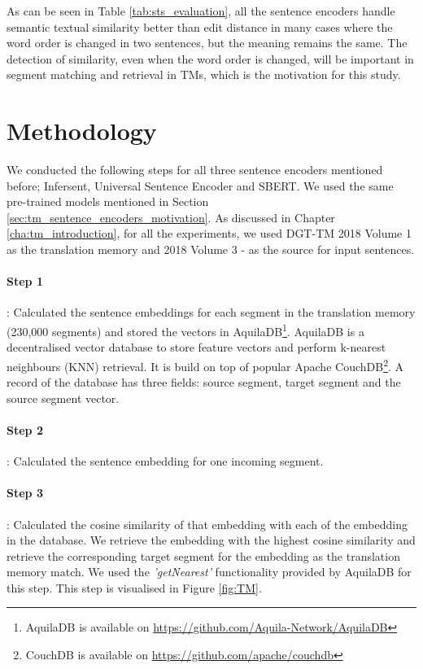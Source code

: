 As can be seen in Table \ref{tab:sts_evaluation}, all the sentence encoders handle semantic textual similarity better than edit distance in many cases where the word order is changed in two sentences, but the meaning remains the same. The detection of similarity, even when the word order is changed, will be important in segment matching and retrieval in TMs, which is the motivation for this study.


\section{Methodology}
\label{sec:tm_sentence_encoders_method}

We conducted the following steps for all three sentence encoders mentioned before; Infersent, Universal Sentence Encoder and SBERT. We used the same pre-trained models mentioned in Section \ref{sec:tm_sentence_encoders_motivation}. As discussed in Chapter \ref{cha:tm_introduction}, for all the experiments, we used DGT-TM 2018 Volume 1 as the translation memory and 2018 Volume 3 - as the source for input sentences. 


	\paragraph{Step 1}: Calculated the sentence embeddings for each segment in the translation memory (230,000 segments) and stored the vectors in AquilaDB\footnote{AquilaDB is available on \url{https://github.com/Aquila-Network/AquilaDB}}. AquilaDB is a decentralised vector database to store feature vectors and perform k-nearest neighbours (KNN) retrieval. It is build on top of popular Apache CouchDB\footnote{CouchDB is available on \url{https://github.com/apache/couchdb}}. A record of the database has three fields: source segment, target segment and the source segment vector.
	
	\paragraph{Step 2}: Calculated the sentence embedding for one incoming segment. 
	
	\paragraph{Step 3}: Calculated the cosine similarity of that embedding with each of the embedding in the database. We retrieve the embedding with the highest cosine similarity and retrieve the corresponding target segment for the embedding as the translation memory match. We used the \textit{'getNearest'} functionality provided by AquilaDB for this step. This step is visualised in Figure \ref{fig:TM}.
	
